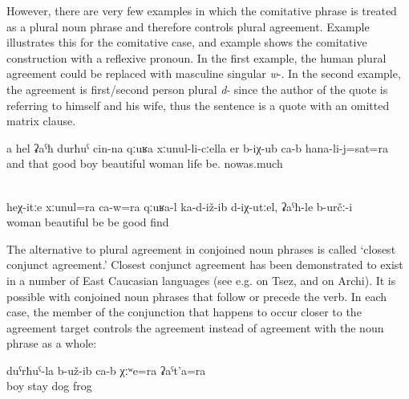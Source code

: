 However, there are very few examples in which the comitative phrase is treated as a plural noun phrase and therefore controls plural agreement. Example  illustrates this for the comitative case, and example  shows the comitative construction with a reflexive pronoun. In the first example, the human plural agreement could be replaced with masculine singular \textit{w}-. In the second example, the agreement is first/second person plural \textit{d}- since the author of the quote is referring to himself and his wife, thus the sentence is a quote with an omitted matrix clause.
%
\begin{exe}
	\ex	\label{ex:‎The good boy with this beautiful wife lived until now}
	\gll	a	hel	ʡaˁħ	durħuˁ	cin-na	qːuʁa	xːunul-li-cːella er b-iχ-ub ca-b hana-li-j=sat=ra\\
		and	that	good	boy		beautiful	woman	life	be.		nowas.much\\
	\glt	{}

	\\	\label{ex:If he would sit together with his wife well like this, this would be good}
	\gll	heχ-itːe xːunul=ra	ca-w=ra	qːuʁa-l	ka-d-iž-ib	d-iχ-utːel,	ʡaˁħ-le	b-určː-i\\
			woman		beautiful	be	be	good	find\\
	\glt	{}
\end{exe}

The alternative to plural agreement in conjoined noun phrases is called `closest conjunct agreement.' Closest conjunct agreement has been demonstrated to exist in a number of East Caucasian languages (see e.g. \citealp{Polinsky.etal2009} on Tsez, and \citealp{Chumakina2014} on Archi). It is possible with conjoined noun phrases that follow or precede the verb. In each case, the member of the conjunction that happens to occur closer to the agreement target controls the agreement instead of agreement with the noun phrase as a whole:
%
\begin{exe}
	\ex	\label{ex:‎The boy had a dog and a frog}
	\gll	duˁrħuˁ-la	b-už-ib	ca-b	χːʷe=ra	ʡaˁt'a=ra\\
		boy	stay		dog\tsc{=add}	frog\\
	\glt	{}
\end{exe}

